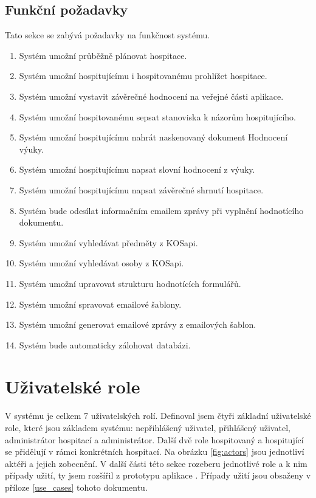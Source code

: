 \subsection{Funkční požadavky}
Tato sekce se zabývá požadavky na funkčnost systému.
\begin{enumerate}
\item Systém umožní průběžně plánovat hospitace.
\item Systém umožní hospitujícímu i hospitovanému prohlížet hospitace.
\item Systém umožní vystavit závěrečné hodnocení na veřejné části aplikace. 
\item Systém umožní hospitovanému sepsat stanoviska k názorům hospitujícího.
\item Systém umožní hospitujícímu nahrát naskenovaný dokument Hodnocení výuky.
\item Systém umožní hospitujícímu napsat slovní hodnocení z výuky.
\item Systém umožní hospitujícímu napsat závěrečné shrnutí hospitace.
\item Systém bude odesílat informačním emailem zprávy při vyplnění hodnotícího dokumentu.
\item Systém umožní vyhledávat předměty z KOSapi.
\item Systém umožní vyhledávat osoby z KOSapi.
\item Systém umožní upravovat strukturu hodnotících formulářů.
\item Systém umožní spravovat emailové šablony.
\item Systém umožní generovat emailové zprávy z emailových šablon.
\item Systém bude automaticky zálohovat databázi.
\end{enumerate}

\section{Uživatelské role}
V systému je celkem 7 uživatelských rolí. Definoval jsem čtyři základní uživatelské role, které jsou základem systému: nepřihlášený uživatel, přihlášený uživatel, administrátor hospitací a administrátor. Další dvě role hospitovaný a hospitující se přidělují v rámci konkrétních hospitací. Na obrázku \ref{fig:actors} jsou jednotliví aktéři a jejich zobecnění. V další části této sekce rozeberu jednotlivé role a k nim případy užití, ty jsem rozšířil z prototypu aplikace \citep{prototyp_documentace}. Případy užití jsou obsaženy v příloze \ref{use_cases} tohoto dokumentu. 

